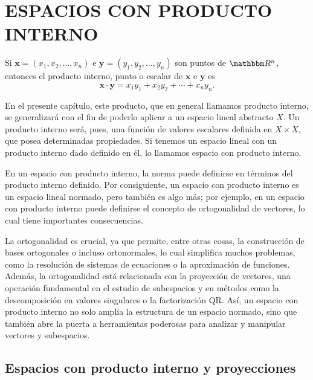 \chapter{ESPACIOS CON PRODUCTO INTERNO}
\printchaptertableofcontents

Si $\mathbf{x} = (x_1, x_2, \dots, x_n)$ e $\mathbf{y} = (y_1, y_2, \dots, y_n)$ son puntos de $\RR[n]$, entonces el producto interno, punto o escalar de $\mathbf{x}$ e $\mathbf{y}$ es
$$\mathbf{x} \cdot \mathbf{y} = x_1y_1 + x_2y_2 + \cdots + x_ny_n.$$

En el presente capítulo, este producto, que en general llamamos producto interno, se generalizará con el fin de poderlo aplicar a un espacio lineal abstracto $X$. Un producto interno será, pues, una función de valores escalares definida en $X \times X$, que posea determinadas propiedades. Si tenemos un espacio lineal con un producto interno dado definido en él, lo llamamos espacio con producto interno.

En un espacio con producto interno, la norma puede definirse en términos del producto interno definido. Por consiguiente, un espacio con producto interno es un espacio lineal normado, pero también es algo más; por ejemplo, en un espacio con producto interno puede definirse el concepto de ortogonalidad de vectores, lo cual tiene importantes consecuencias.

La ortogonalidad es crucial, ya que permite, entre otras cosas, la construcción de bases ortogonales o incluso ortonormales, lo cual simplifica muchos problemas, como la resolución de sistemas de ecuaciones o la aproximación de funciones. Además, la ortogonalidad está relacionada con la proyección de vectores, una operación fundamental en el estudio de subespacios y en métodos como la descomposición en valores singulares o la factorización QR. Así, un espacio con producto interno no solo amplía la estructura de un espacio normado, sino que también abre la puerta a herramientas poderosas para analizar y manipular vectores y subespacios.

\newpage

\section{Espacios con producto interno y proyecciones}

